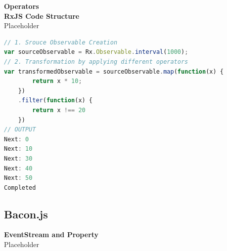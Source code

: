 \textbf{Operators}
\label{subsec:Operators}\\

\textbf{RxJS Code Structure}\\
Placeholder
\begin{lstlisting}[language=JavaScript, caption=RxJS Simple Example, label={lst:RxJS_Simple_Example}]
// 1. Srouce Observable Creation
var sourceObservable = Rx.Observable.interval(1000);
// 2. Transformation by applying different operators
var transformedObservable = sourceObservable.map(function(x) {
		return x * 10;
	})
	.filter(function(x) {
		return x !== 20
	})
// OUTPUT
Next: 0
Next: 10
Next: 30
Next: 40
Next: 50
Completed
\end{lstlisting}

\subsection{Bacon.js}

\textbf{EventStream and Property}\\
Placeholder

